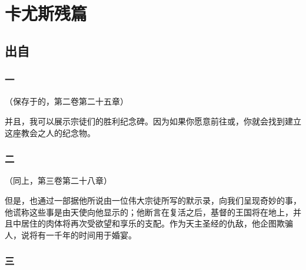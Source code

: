 
\chapter{卡尤斯残篇}



\section{出自}


\subsection{一}

（保存于的，第二卷第二十五章）\par

并且，我可以展示宗徒们的胜利纪念碑。因为如果你愿意前往或，你就会找到建立这座教会之人的纪念物。\par


\subsection{二}

（同上，第三卷第二十八章）\par

但是，也通过一部据他所说由一位伟大宗徒所写的默示录，向我们呈现奇妙的事，他谎称这些事是由天使向他显示的；他断言在复活之后，基督的王国将在地上，并且中居住的肉体将再次受欲望和享乐的支配。作为天主圣经的仇敌，他企图欺骗人，说将有一千年的时间用于婚宴。\par


\subsection{三}


